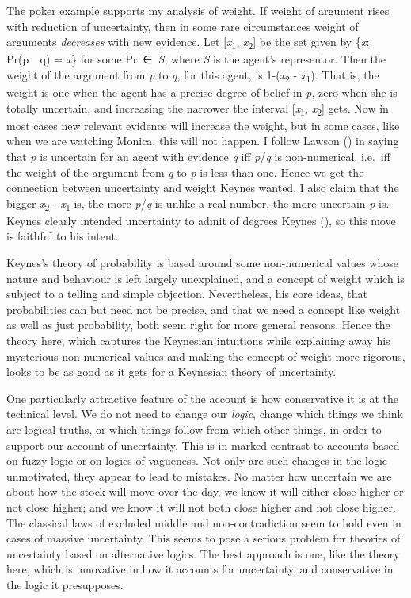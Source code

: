 \documentclass[
  11pt,
  letterpaper,
  DIV=11,
  numbers=noendperiod,
  twoside]{scrartcl}
\begin{document}
The poker example supports my analysis of weight. If weight of argument
rises with reduction of uncertainty, then in some rare circumstances
weight of arguments \emph{decreases} with new evidence. Let
{[}\emph{x}\textsubscript{1}, \emph{x}\textsubscript{2}{]} be the set
given by \{\emph{x}: Pr(p\emph{~\textbar~}q) = \emph{x}\} for some
Pr~∈~\emph{S}, where \emph{S} is the agent's representor. Then the
weight of the argument from \emph{p} to \emph{q}, for this agent, is
1-(\emph{x}\textsubscript{2} - \emph{x}\textsubscript{1}). That is, the
weight is one when the agent has a precise degree of belief in \emph{p},
zero when she is totally uncertain, and increasing the narrower the
interval {[}\emph{x}\textsubscript{1}, \emph{x}\textsubscript{2}{]}
gets. Now in most cases new relevant evidence will increase the weight,
but in some cases, like when we are watching Monica, this will not
happen. I follow Lawson () in saying that
\emph{p} is uncertain for an agent with evidence \emph{q} iff
\emph{p}/\emph{q} is non-numerical, i.e.~iff the weight of the argument
from \emph{q} to \emph{p} is less than one. Hence we get the connection
between uncertainty and weight Keynes wanted. I also claim that the
bigger \emph{x}\textsubscript{2} - \emph{x}\textsubscript{1} is, the
more \emph{p}/\emph{q} is unlike a real number, the more uncertain
\emph{p} is. Keynes clearly intended uncertainty to admit of degrees
Keynes (), so this move is faithful to
his intent.

Keynes's theory of probability is based around some non-numerical values
whose nature and behaviour is left largely unexplained, and a concept of
weight which is subject to a telling and simple objection. Nevertheless,
his core ideas, that probabilities can but need not be precise, and that
we need a concept like weight as well as just probability, both seem
right for more general reasons. Hence the theory here, which captures
the Keynesian intuitions while explaining away his mysterious
non-numerical values and making the concept of weight more rigorous,
looks to be as good as it gets for a Keynesian theory of uncertainty.

One particularly attractive feature of the account is how conservative
it is at the technical level. We do not need to change our \emph{logic},
change which things we think are logical truths, or which things follow
from which other things, in order to support our account of uncertainty.
This is in marked contrast to accounts based on fuzzy logic or on logics
of vagueness. Not only are such changes in the logic unmotivated, they
appear to lead to mistakes. No matter how uncertain we are about how the
stock will move over the day, we know it will either close higher or not
close higher; and we know it will not both close higher and not close
higher. The classical laws of excluded middle and non-contradiction seem
to hold even in cases of massive uncertainty. This seems to pose a
serious problem for theories of uncertainty based on alternative logics.
The best approach is one, like the theory here, which is innovative in
how it accounts for uncertainty, and conservative in the logic it
presupposes.
\end{document}
